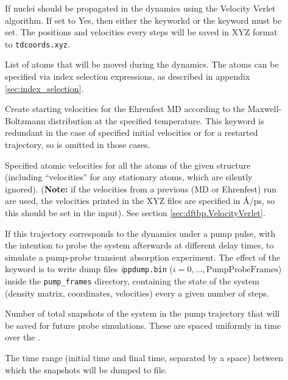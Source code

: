 \begin{description}
\item[] If nuclei should be propagated in the dynamics
  using the Velocity Verlet algorithm. If set to Yes, then either the
   keyworkd or the  keyword must
  be set. The positions and velocities every  steps
  will be saved in XYZ format to \verb|tdcoords.xyz|.

\item[] List of atoms that will be moved during the dynamics. The atoms can be
  specified via index selection expressions, as described in appendix \ref{sec:index_selection}.

\item[] Create starting
  velocities for the Ehrenfest MD according to the Maxwell-Boltzmann
  distribution at the specified temperature. This keyword is redundant in the
  case of specified initial velocities or for a restarted trajectory, so is
  omitted in those cases.

\item[] Specified atomic
  velocities for all the atoms of the given structure (including
  ``velocities'' for any stationary atoms, which are silently
  ignored). (\textbf{Note:} if the velocities from a previous (MD or
  Ehrenfest) run are used, the velocities printed in the XYZ files are
  specified in {\AA}/ps, so this should be set in the input). See
  section \ref{sec:dftbp.VelocityVerlet}.

\item[] If this trajectory corresponds to the dynamics under
  a pump pulse, with the intention to probe the system afterwards at
  different delay times, to simulate a pump-probe transient absorption
  experiment. The effect of the keyword is to write dump files
  \textit{i}\verb|ppdump.bin| ($i=0,\dots,\mathrm{PumpProbeFrames}$)
  inside the \verb|pump_frames| directory,
  containing the state of the system (density matrix, coordinates,
  velocities) every a given number of steps.

\item[] Number of total snapshots of the system in
  the pump trajectory that will be saved for future probe
  simulations. These are spaced uniformly in time over the
  .

\item[] The time range
  (initial time and final time, separated by a space) between which
  the snapshots will be dumped to file.


\end{description}

